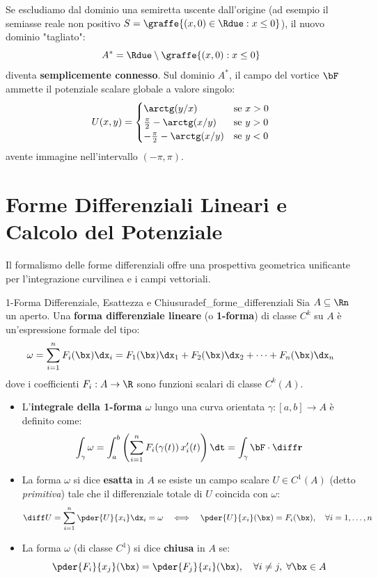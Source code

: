 \begin{osservazione}
Se escludiamo dal dominio una semiretta uscente dall'origine (ad esempio il semiasse reale non positivo $S = \graffe{(x,0) \in \Rdue : x \le 0}$), il nuovo dominio "tagliato":
\[
A^* = \Rdue \setminus \graffe{(x,0) : x \le 0}
\]
diventa \textbf{semplicemente connesso}. Sul dominio $A^*$, il campo del vortice $\bF$ ammette il potenziale scalare globale a valore singolo:
\[
U(x,y) = \begin{cases} \arctg(y/x) & \text{se } x > 0 \\ \frac{\pi}{2} - \arctg(x/y) & \text{se } y > 0 \\ -\frac{\pi}{2} - \arctg(x/y) & \text{se } y < 0 \end{cases}
\]
avente immagine nell'intervallo $(-\pi, \pi)$.
\end{osservazione}

\section{Forme Differenziali Lineari e Calcolo del Potenziale}

Il formalismo delle forme differenziali offre una prospettiva geometrica unificante per l'integrazione curvilinea e i campi vettoriali.

\begin{definizione}{1-Forma Differenziale, Esattezza e Chiusura}{def_forme_differenziali}
Sia $A \subseteq \Rn$ un aperto. Una \textbf{forma differenziale lineare} (o \textbf{1-forma}) di classe $C^k$ su $A$ è un'espressione formale del tipo:
\[
\omega = \sum_{i=1}^n F_i(\bx) \dx_i = F_1(\bx) \dx_1 + F_2(\bx) \dx_2 + \dots + F_n(\bx) \dx_n
\]
dove i coefficienti $F_i: A \to \R$ sono funzioni scalari di classe $C^k(A)$.
\begin{itemize}
    \item L'\textbf{integrale della 1-forma $\omega$} lungo una curva orientata $\gamma: [a,b] \to A$ è definito come:
    \[
    \int_\gamma \omega = \int_{a}^{b} \left( \sum_{i=1}^n F_i(\gamma(t)) \, x_i'(t) \right) \dt = \int_\gamma \bF \cdot \diff\mathbf{r}
    \]
    \item La forma $\omega$ si dice \textbf{esatta} in $A$ se esiste un campo scalare $U \in C^1(A)$ (detto \emph{primitiva}) tale che il differenziale totale di $U$ coincida con $\omega$:
    \[
    \diff U = \sum_{i=1}^n \pder{U}{x_i} \dx_i = \omega \quad \Longleftrightarrow \quad \pder{U}{x_i}(\bx) = F_i(\bx), \quad \forall i=1,\dots,n
    \]
    \item La forma $\omega$ (di classe $C^1$) si dice \textbf{chiusa} in $A$ se:
    \[
    \pder{F_i}{x_j}(\bx) = \pder{F_j}{x_i}(\bx), \quad \forall i \neq j, \; \forall \bx \in A
    \]
\end{itemize}
\end{definizione}

